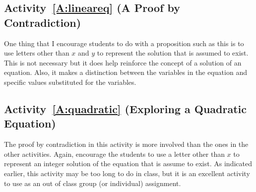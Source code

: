 
%

\subsection*{Activity~\ref{A:lineareq} (A Proof by Contradiction)}
One thing that I encourage students to do with a proposition such as this is to use letters other than $x$ and $y$ to represent the solution that is assumed to exist.  This is not necessary but it does help reinforce the concept of a solution of an equation.  Also, it makes a distinction between the variables in the equation and specific values substituted for the variables.

\subsection*{Activity~\ref{A:quadratic} (Exploring a Quadratic Equation)}
The proof by contradiction in this activity is more involved than the ones in the other activities.  Again, encourage the students to use a letter other than $x$ to represent an integer  solution of the equation that is assume to exist.  As indicated earlier,  this activity may be too long to do in class, but it is an excellent activity to use as an out of class group (or individual) assignment.
\hbreak


